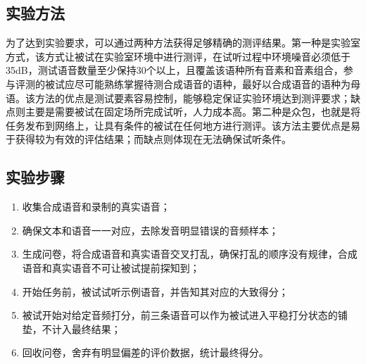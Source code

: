 \documentclass[cn,10pt,math=newtx,citestyle=gb7714-2015,bibstyle=gb7714-2015]{elegantbook}
\begin{document}
\subsection{实验方法}
为了达到实验要求，可以通过两种方法获得足够精确的测评结果。第一种是实验室方式，该方式让被试在实验室环境中进行测评，在试听过程中环境噪音必须低于35dB，测试语音数量至少保持30个以上，且覆盖该语种所有音素和音素组合，参与评测的被试应尽可能熟练掌握待测合成语音的语种，最好以合成语音的语种为母语。该方法的优点是测试要素容易控制，能够稳定保证实验环境达到测评要求；缺点则主要是需要被试在固定场所完成试听，人力成本高。第二种是众包，也就是将任务发布到网络上，让具有条件的被试在任何地方进行测评。该方法主要优点是易于获得较为有效的评估结果；而缺点则体现在无法确保试听条件。
\subsection{实验步骤}
\begin{enumerate}
  \item 收集合成语音和录制的真实语音；
  \item 确保文本和语音一一对应，去除发音明显错误的音频样本；
  \item 生成问卷，将合成语音和真实语音交叉打乱，确保打乱的顺序没有规律，合成语音和真实语音不可让被试提前探知到；
  \item 开始任务前，被试试听示例语音，并告知其对应的大致得分；
  \item 被试开始对给定音频打分，前三条语音可以作为被试进入平稳打分状态的铺垫，不计入最终结果；
  \item 回收问卷，舍弃有明显偏差的评价数据，统计最终得分。
\end{enumerate}
\end{document}
